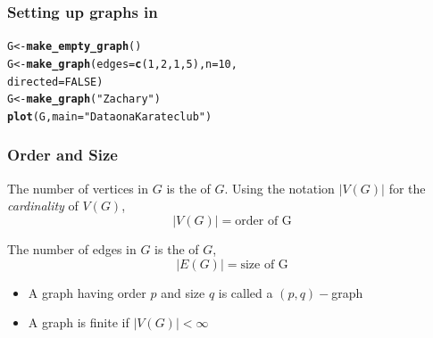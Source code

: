 \documentclass[aspectratio=169]{beamer}\usepackage[]{graphicx}\usepackage[]{xcolor}
\makeatletter
\newcommand{\hlnum}[1]{\textcolor[rgb]{0.686,0.059,0.569}{#1}}%
\newcommand{\hlsng}[1]{\textcolor[rgb]{0.192,0.494,0.8}{#1}}%
\newcommand{\hldef}[1]{\textcolor[rgb]{0.345,0.345,0.345}{#1}}%
\newcommand{\hlkwb}[1]{\textcolor[rgb]{0.69,0.353,0.396}{#1}}%
\newcommand{\hlkwc}[1]{\textcolor[rgb]{0.333,0.667,0.333}{#1}}%
\newcommand{\hlkwd}[1]{\textcolor[rgb]{0.737,0.353,0.396}{\textbf{#1}}}%
\newenvironment{kframe}{%
 \def\at@end@of@kframe{}%
 \ifinner\ifhmode%
  \def\at@end@of@kframe{\end{minipage}}%
  \begin{minipage}{\columnwidth}%
 \fi\fi%
 \def\FrameCommand##1{\hskip\@totalleftmargin \hskip-\fboxsep
 \colorbox{shadecolor}{##1}\hskip-\fboxsep
     \hskip-\linewidth \hskip-\@totalleftmargin \hskip\columnwidth}%
 \MakeFramed {\advance\hsize-\width
   \@totalleftmargin\z@ \linewidth\hsize
   \@setminipage}}%
 {\par\unskip\endMakeFramed%
 \at@end@of@kframe}
\newenvironment{knitrout}{}{} %
\makeatother
\begin{document}
\begin{frame}[fragile]\frametitle{Setting up graphs in }
\begin{knitrout}
\color{fgcolor}\begin{kframe}
\begin{alltt}
\hldef{G} \hlkwb{<-} \hlkwd{make_empty_graph}\hldef{()}
\hldef{G} \hlkwb{<-} \hlkwd{make_graph}\hldef{(}\hlkwc{edges} \hldef{=} \hlkwd{c}\hldef{(}\hlnum{1}\hldef{,} \hlnum{2}\hldef{,} \hlnum{1}\hldef{,} \hlnum{5}\hldef{),} \hlkwc{n} \hldef{=} \hlnum{10}\hldef{,}
                \hlkwc{directed} \hldef{=} \hlnum{FALSE}\hldef{)}
\hldef{G} \hlkwb{<-} \hlkwd{make_graph}\hldef{(}\hlsng{"Zachary"}\hldef{)}
\hlkwd{plot}\hldef{(G,} \hlkwc{main} \hldef{=} \hlsng{"Data on a Karate club"}\hldef{)}
\end{alltt}
\end{kframe}
\end{knitrout}
\end{frame}


\begin{frame}\frametitle{Order and Size}
	\begin{definition}
	The number of vertices in $G$ is the  of $G$. Using the notation $|V(G)|$ for the \emph{cardinality} of $V(G)$,
	$$|V(G)|=\textrm{order of G}$$
	\end{definition}
	\vfill
	\begin{definition}
	The number of edges in $G$ is the  of $G$,
	$$|E(G)|=\textrm{size of G}$$
	\end{definition}
	\vfill
	\begin{itemize}
	\item A graph having order $p$ and size $q$ is called a $(p,q)-$graph
	\item A graph is finite if $|V(G)|<\infty$
	\end{itemize}
\end{frame}
\end{document}
